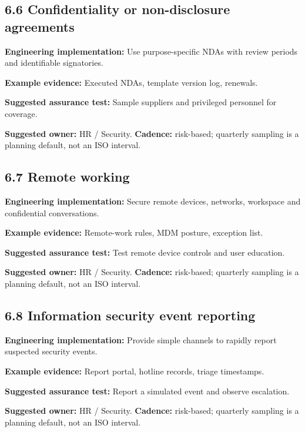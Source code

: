 \documentclass[11pt,letterpaper]{article}
\begin{document}
\subsection{6.6 Confidentiality or non-disclosure agreements}
\textbf{Engineering implementation:} Use purpose-specific NDAs with review periods and identifiable signatories.\par
\textbf{Example evidence:} Executed NDAs, template version log, renewals.\par
\textbf{Suggested assurance test:} Sample suppliers and privileged personnel for coverage.\par
\textbf{Suggested owner:} HR / Security. \textbf{Cadence:} risk-based; quarterly sampling is a planning default, not an ISO interval.\par
{}
\subsection{6.7 Remote working}
\textbf{Engineering implementation:} Secure remote devices, networks, workspace and confidential conversations.\par
\textbf{Example evidence:} Remote-work rules, MDM posture, exception list.\par
\textbf{Suggested assurance test:} Test remote device controls and user education.\par
\textbf{Suggested owner:} HR / Security. \textbf{Cadence:} risk-based; quarterly sampling is a planning default, not an ISO interval.\par
{}
\subsection{6.8 Information security event reporting}
\textbf{Engineering implementation:} Provide simple channels to rapidly report suspected security events.\par
\textbf{Example evidence:} Report portal, hotline records, triage timestamps.\par
\textbf{Suggested assurance test:} Report a simulated event and observe escalation.\par
\textbf{Suggested owner:} HR / Security. \textbf{Cadence:} risk-based; quarterly sampling is a planning default, not an ISO interval.\par
{}
\end{document}
